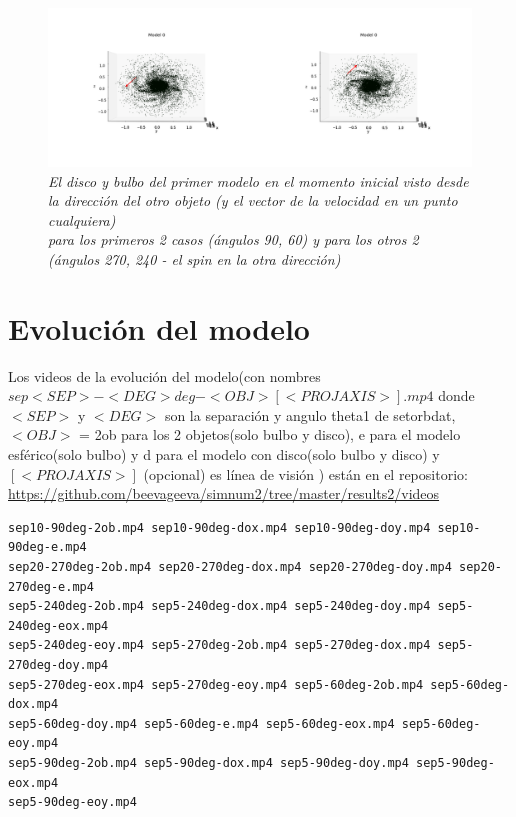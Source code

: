 \documentclass[12pt]{article} %
\renewcommand{\=}[1]{\stackrel{#1}{=}} %
\theoremstyle{definition}
\theoremstyle{remark}
\begin{document}
\begin{figure}[!ht]
 \centering
 \includegraphics[scale=0.2]{inimoddisco_sep5.png}
 \caption{\emph{El disco y bulbo del primer modelo en el momento inicial visto desde la dirección del otro objeto (y el vector de la velocidad en un punto cualquiera) \\
para los primeros 2 casos (ángulos 90, 60) y para los otros 2 (ángulos 270, 240 - el spin en la otra dirección)}}
\end{figure}





\newpage
\section*{Evolución del modelo}

Los videos de la evolución del modelo(con nombres $sep<SEP>-<DEG>deg-<OBJ>[<PROJAXIS>].mp4 $ donde $<SEP>$ y $<DEG>$ son la separación y angulo theta1 de setorbdat, $<OBJ>$ = 2ob para los 2 objetos(solo bulbo y disco), e para el modelo esférico(solo bulbo) y d para el modelo con disco(solo bulbo y disco) y  $[<PROJAXIS>]$ (opcional) es línea de visión )
están en el repositorio:
\url{https://github.com/beevageeva/simnum2/tree/master/results2/videos}
\small
\begin{verbatim}
sep10-90deg-2ob.mp4 sep10-90deg-dox.mp4 sep10-90deg-doy.mp4 sep10-90deg-e.mp4
sep20-270deg-2ob.mp4 sep20-270deg-dox.mp4 sep20-270deg-doy.mp4 sep20-270deg-e.mp4
sep5-240deg-2ob.mp4 sep5-240deg-dox.mp4 sep5-240deg-doy.mp4 sep5-240deg-eox.mp4
sep5-240deg-eoy.mp4 sep5-270deg-2ob.mp4 sep5-270deg-dox.mp4 sep5-270deg-doy.mp4
sep5-270deg-eox.mp4 sep5-270deg-eoy.mp4 sep5-60deg-2ob.mp4 sep5-60deg-dox.mp4
sep5-60deg-doy.mp4 sep5-60deg-e.mp4 sep5-60deg-eox.mp4 sep5-60deg-eoy.mp4
sep5-90deg-2ob.mp4 sep5-90deg-dox.mp4 sep5-90deg-doy.mp4 sep5-90deg-eox.mp4
sep5-90deg-eoy.mp4
\end{verbatim}

\normalsize
\end{document}
